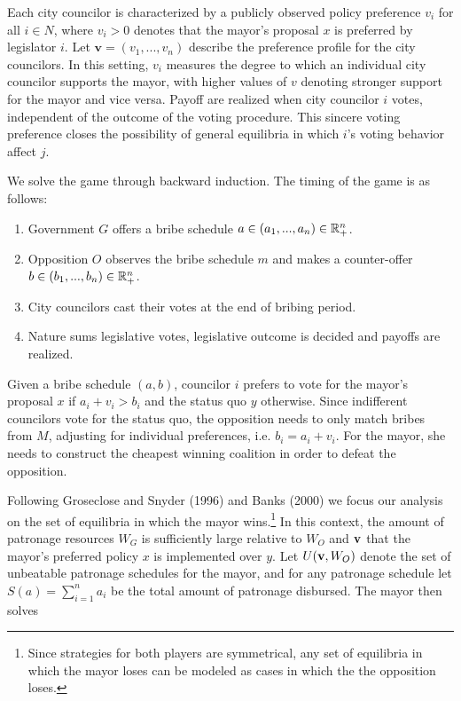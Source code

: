 Each city councilor is characterized by a publicly observed policy preference $v_i$ for all $i \in N$, where $v_i > 0$ denotes that the mayor's proposal $x$ is preferred by legislator $i$. Let $\mathbf{v} = (v_1, ..., v_n)$ describe the preference profile for the city councilors. In this setting, $v_i$ measures the degree to which an individual city councilor supports the mayor, with higher values of $v$ denoting stronger support for the mayor and vice versa. Payoff are realized when city councilor $i$ votes, independent of the outcome of the voting procedure. This sincere voting preference closes the possibility of general equilibria in which $i$'s voting behavior affect $j$.

We solve the game through backward induction. The timing of the game is as follows:

\begin{enumerate}
    \item Government $G$ offers a bribe schedule $a \in (a_1, ..., a_n) \in \mathbb{R}_+^n$.
    \item Opposition $O$ observes the bribe schedule $m$ and makes a counter-offer $b \in (b_1, ..., b_n) \in \mathbb{R}_+^n$.
    \item City councilors cast their votes at the end of bribing period.
    \item Nature sums legislative votes, legislative outcome is decided and payoffs are realized.
\end{enumerate}

Given a bribe schedule $(a, b)$, councilor $i$ prefers to vote for the mayor's proposal $x$ if $a_i + v_i > b_i$ and the status quo $y$ otherwise. Since indifferent councilors vote for the status quo, the opposition needs to only match bribes from $M$, adjusting for individual preferences, i.e. $b_i = a_i + v_i$. For the mayor, she needs to construct the cheapest winning coalition in order to defeat the opposition. 

Following Groseclose and Snyder (1996) and Banks (2000) we focus our analysis on the set of equilibria in which the mayor wins.\footnote{Since strategies for both players are symmetrical, any set of equilibria in which the mayor loses can be modeled as cases in which the the opposition loses.} In this context, the amount of patronage resources $W_G$ is sufficiently large relative to $W_O$ and $\mathbf{v}$ that the mayor's preferred policy $x$ is implemented over $y$. Let $U(\mathbf{v}, W_O)$ denote the set of unbeatable patronage schedules for the mayor, and for any patronage schedule let $S(a) = \sum_{i = 1}^n a_i$ be the total amount of patronage disbursed. The mayor then solves


